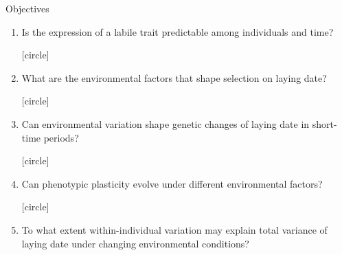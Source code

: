 \documentclass[compress]{beamer}
\begin{document}
\begin{frame}{Objectives}
   \begin{enumerate}
  [circle]
   \small
\item Is the expression of a labile trait predictable among individuals and time? \\
\vspace{0.3cm}

  [circle] 
\item What are the environmental factors that shape selection on laying date? \\
\vspace{0.3cm}

  [circle]
\item Can environmental variation shape genetic changes of laying date in short-time periods? \\
\vspace{0.3cm}

  [circle]
\item  Can phenotypic plasticity evolve under different environmental factors? \\
\vspace{0.3cm}

  [circle]
\item  To what extent within-individual variation may explain total variance of laying date under changing environmental conditions? \\
\end{enumerate}
  \end{frame}
\end{document}
